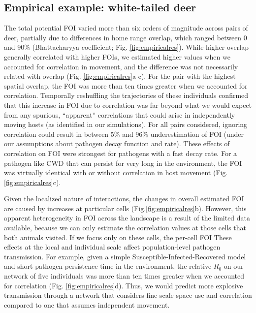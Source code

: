 \documentclass[letterpaper]{article}
\begin{document}
\subsection*{Empirical example: white-tailed deer}

The total potential FOI %
varied more than six orders of magnitude across pairs of deer, partially due to differences in home range overlap, which ranged between 0 and 90\% (Bhattacharyya coefficient; Fig. \ref{fig:empiricalres}). While higher overlap generally correlated with higher FOIs, we estimated higher values when we accounted for correlation in movement, and the difference was not necessarily related with overlap (Fig. \ref{fig:empiricalres}a-c).  For the pair with the highest spatial overlap, the FOI was more than ten times greater when we accounted for correlation. Temporally reshuffling the trajectories of these individuals  \citet[following ][]{Spiegel2016} confirmed that this increase in FOI due to correlation was far beyond what we would expect from any  spurious, ``apparent'' correlations that could arise in independently moving hosts (as identified in our simulations). For all pairs considered, ignoring correlation could result in between 5\% and 96\% underestimation of FOI (under our assumptions about pathogen decay function and rate). These effects of correlation on FOI were strongest for pathogens with a fast decay rate. For a pathogen like CWD that can persist for very long in the environment, the FOI was virtually identical with or without correlation in host movement (Fig. \ref{fig:empiricalres}c). 

Given the localized nature of interactions, the changes in overall estimated FOI are caused by increases at particular cells (Fig.\ref{fig:empiricalres}b). However, this apparent heterogeneity in FOI across the landscape is a result of the limited data available, because we can only estimate the correlation values at those cells that both animals visited. If we focus only on these cells, the per-cell FOI   %
These effects at the local and individual scale affect population-level pathogen transmission. For example, given a simple Susceptible-Infected-Recovered model and short pathogen persistence time in the environment, the relative $R_0$ on our network of five individuals was more than ten times greater when we accounted for correlation (Fig. \ref{fig:empiricalres}d). Thus, we would predict more explosive transmission through a network that considers fine-scale space use and correlation compared to one that assumes independent movement.
\end{document}
